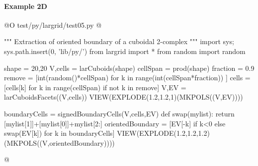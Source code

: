 \documentclass[11pt,oneside]{article}	%
\begin{document}
\paragraph{Example 2D}

@O test/py/largrid/test05.py
@{""" Extraction of oriented boundary of a cuboidal 2-complex """
import sys; sys.path.insert(0, 'lib/py/')
from largrid import *
from random import random

shape = 20,20
V,cells = larCuboids(shape)
cellSpan = prod(shape)
fraction = 0.9
remove = [int(random()*cellSpan) for k in range(int(cellSpan*fraction)) ]
cells = [cells[k] for k in range(cellSpan) if not k in remove]
V,EV = larCuboidsFacets((V,cells))
VIEW(EXPLODE(1.2,1.2,1)(MKPOLS((V,EV))))

boundaryCells = signedBoundaryCells(V,cells,EV)
def swap(mylist): return [mylist[1]]+[mylist[0]]+mylist[2:]
orientedBoundary = [EV[-k] if k<0 else swap(EV[k]) for k in boundaryCells]
VIEW(EXPLODE(1.2,1.2,1.2)(MKPOLS((V,orientedBoundary))))

@}
\end{document}
